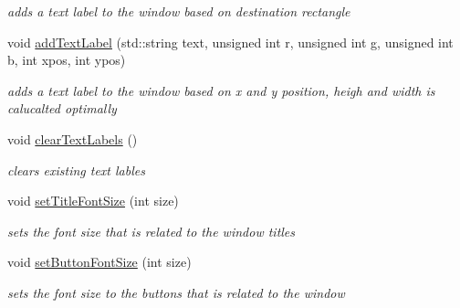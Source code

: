 \begin{DoxyCompactItemize}
\begin{DoxyCompactList}\small\item\em adds a text label to the window based on destination rectangle \end{DoxyCompactList}\item 
\hypertarget{class_text_based_window_a5cb46bf75bed08606abbb70a0b2f4264}{}\label{class_text_based_window_a5cb46bf75bed08606abbb70a0b2f4264} 
void \hyperlink{class_text_based_window_a5cb46bf75bed08606abbb70a0b2f4264}{add\+Text\+Label} (std\+::string text, unsigned int r, unsigned int g, unsigned int b, int xpos, int ypos)
\begin{DoxyCompactList}\small\item\em adds a text label to the window based on x and y position, heigh and width is calucalted optimally \end{DoxyCompactList}\item 
\hypertarget{class_text_based_window_a9fbef218ed53bcb17766014bb39e563c}{}\label{class_text_based_window_a9fbef218ed53bcb17766014bb39e563c} 
void \hyperlink{class_text_based_window_a9fbef218ed53bcb17766014bb39e563c}{clear\+Text\+Labels} ()
\begin{DoxyCompactList}\small\item\em clears existing text lables \end{DoxyCompactList}\item 
\hypertarget{class_text_based_window_a089c5c1f5090c9ad71421cdad3286723}{}\label{class_text_based_window_a089c5c1f5090c9ad71421cdad3286723} 
void \hyperlink{class_text_based_window_a089c5c1f5090c9ad71421cdad3286723}{set\+Title\+Font\+Size} (int size)
\begin{DoxyCompactList}\small\item\em sets the font size that is related to the window titles \end{DoxyCompactList}\item 
\hypertarget{class_text_based_window_a0c50e613daa00b4fe99ef1f290006038}{}\label{class_text_based_window_a0c50e613daa00b4fe99ef1f290006038} 
void \hyperlink{class_text_based_window_a0c50e613daa00b4fe99ef1f290006038}{set\+Button\+Font\+Size} (int size)
\begin{DoxyCompactList}\small\item\em sets the font size to the buttons that is related to the window \end{DoxyCompactList}\item 
\hypertarget{class_text_based_window_a9a63ff592b3a31e6cf5db15b0e10656c}{}\label{class_text_based_window_a9a63ff592b3a31e6cf5db15b0e10656c} 

\end{DoxyCompactItemize}
